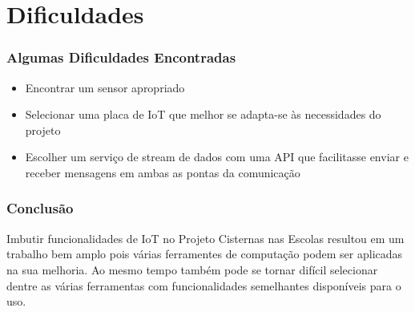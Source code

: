 \documentclass{beamer}
\begin{document}
\section{Dificuldades}

\begin{frame}
\frametitle{Algumas Dificuldades Encontradas}
\begin{minipage}{\textwidth}
	
	
	\begin{itemize}
		\item Encontrar um sensor apropriado
		\item Selecionar uma placa de IoT que melhor se adapta-se às necessidades do projeto
		\item Escolher um serviço de stream de dados com uma API que facilitasse enviar e receber mensagens em ambas as pontas da comunicação
		
	\end{itemize}

\end{minipage}
\end{frame}

\begin{frame}
\frametitle{Conclusão}
\begin{minipage}{\textwidth}
	Imbutir funcionalidades de IoT no Projeto Cisternas nas Escolas resultou em um trabalho bem amplo pois várias ferramentes de computação podem ser aplicadas na sua melhoria. Ao mesmo tempo também pode se tornar difícil selecionar dentre as várias ferramentas com funcionalidades semelhantes disponíveis para o uso.
\end{minipage}
\end{frame}
\end{document}
